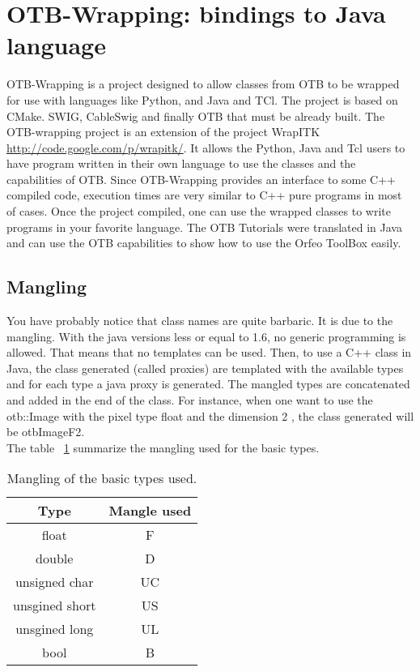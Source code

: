 \section{OTB-Wrapping: bindings to Java language}
OTB-Wrapping is a project designed to allow classes from OTB 
to be wrapped for use with languages like Python, and Java and TCl. 
The project is based on CMake. SWIG, CableSwig and finally OTB that must be already built.
 The OTB-wrapping project is an extension of the project WrapITK \url{http://code.google.com/p/wrapitk/}. 
It allows the Python, Java and Tcl users to have program written in their own language to use the classes and 
the capabilities of OTB.
Since OTB-Wrapping provides an interface to some C++ compiled code, execution times are very similar to C++ 
pure programs in most of cases.
Once the project compiled, one can use the wrapped classes to write programs in your favorite language.
The OTB Tutorials were translated in Java and can use the OTB capabilities to show how to use the 
Orfeo ToolBox easily. 

\subsection{Mangling}
You have probably notice that class names are quite barbaric. It is due to the mangling. 
With the java versions less or equal to 1.6, no generic programming is allowed. That means that no templates can be used. 
Then, to use a C++  class in Java, the class generated (called proxies) are templated with the available types and for each type a java proxy is generated. 
The mangled types are concatenated and added in the end of the class.
For instance, when one want to use the otb::Image with the pixel type float and the dimension 2 , the class generated will be otbImageF2. \\

The table ~\ref{tab:basictypetomangle} summarize the mangling used for the basic types. 

\begin{table}[!htbp]
\begin{center}
\begin{tabular}{|c|c|}
\hline
Type                  &  Mangle used  \\
\hline
float                 &  F         \\
double                &  D         \\
unsigned char         &  UC        \\
unsgined short        &  US        \\
unsgined long         &  UL        \\
bool                  &  B         \\

\hline 
\end{tabular}
\caption{Mangling of the basic types used.}\label{tab:basictypetomangle}
\end{center}
\end{table}

